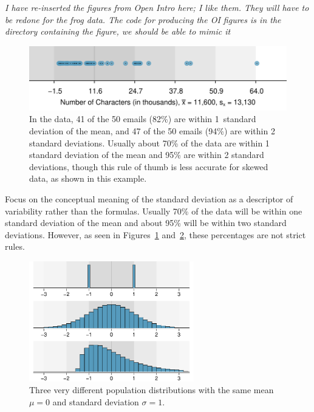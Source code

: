 \begin{doublespace}
\textit{I have re-inserted the figures from Open Intro here; I like them.  They will have to be redone for the frog data.  The code for producing the OI figures is in the directory containing the figure, we should be able to mimic it}

\begin{figure}
	\centering
	\includegraphics[width=\mycaptionwidth]{ch_intro_to_data_oi_biostat/figures/sdAsRuleForEmailNumChar/sdAsRuleForEmailNumChar}
	\caption{In the  data, 41 of the 50 emails (82\%) are within 1~standard deviation of the mean, and 47 of the 50 emails (94\%) are within 2 standard deviations. Usually about 70\% of the data are within 1 standard deviation of the mean and 95\% are within 2 standard deviations, though this rule of thumb is less accurate for skewed data, as shown in this example.}
	\label{sdAsRuleForEmailNumChar}
\end{figure}

\begin{tipBox}{
		Focus on the conceptual meaning of the standard deviation as a descriptor of variability rather than the formulas. Usually 70\% of the data will be within one standard deviation of the mean and about 95\% will be within two standard deviations. However, as seen in Figures~\ref{sdAsRuleForEmailNumChar} and~\ref{severalDiffDistWithSdOf1}, these percentages are not strict rules.}
\end{tipBox}

\begin{figure}
	\centering
	\includegraphics[width=0.64\textwidth]{ch_intro_to_data_oi_biostat/figures/severalDiffDistWithSdOf1/severalDiffDistWithSdOf1}
	\caption{Three very different population distributions with the same mean $\mu=0$ and standard deviation $\sigma=1$.}
	\label{severalDiffDistWithSdOf1}
\end{figure}


\end{doublespace}
